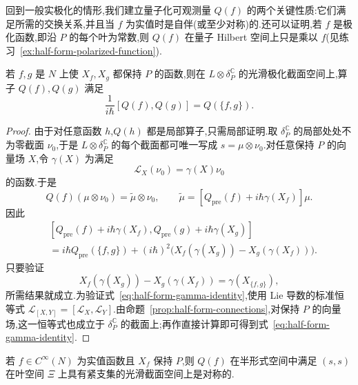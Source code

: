 回到一般实极化的情形,我们建立量子化可观测量 $Q(f)$ 的两个关键性质:它们满足所需的交换关系,并且当 $f$ 为实值时是自伴(或至少对称)的.还可以证明,若 $f$ 是极化函数,即沿 $P$ 的每个叶为常数,则 $Q(f)$ 在量子 Hilbert 空间上只是乘以 $f$(见练习~\ref{ex:half-form-polarized-function}).

\begin{theorem}[半形式量子算子的交换关系]
\label{thm:half-form-commutator-real}
若 $f,g$ 是 $N$ 上使 $X_f,X_g$ 都保持 $P$ 的函数,则在 $L\otimes\delta_P^{\mathbb C}$ 的光滑极化截面空间上,算子 $Q(f),Q(g)$ 满足
\[
 \frac1{i\hbar}[Q(f),Q(g)]=Q(\{f,g\}).
 \label{eq:half-form-commutator-real}
\]
\end{theorem}

\begin{proof}
由于对任意函数 $h$,$Q(h)$ 都是局部算子,只需局部证明.取 $\delta_P^{\mathbb C}$ 的局部处处不为零截面 $\nu_0$,于是 $L\otimes\delta_P^{\mathbb C}$ 的每个截面都可唯一写成 $s=\mu\otimes\nu_0$.对任意保持 $P$ 的向量场 $X$,令 $\gamma(X)$ 为满足
\[
 \mathcal L_X(\nu_0)=\gamma(X)\nu_0
\]
的函数.于是
\[
 Q(f)(\mu\otimes\nu_0)=\widetilde\mu\otimes\nu_0,
 \qquad \widetilde\mu=[Q_{\mathrm{pre}}(f)+i\hbar\gamma(X_f)]\mu.
\]
因此
\[
\begin{aligned}
 &[Q_{\mathrm{pre}}(f)+i\hbar\gamma(X_f),Q_{\mathrm{pre}}(g)+i\hbar\gamma(X_g)]\\
 &=i\hbar Q_{\mathrm{pre}}(\{f,g\})
 +(i\hbar)^2\bigl(X_f(\gamma(X_g))-X_g(\gamma(X_f))\bigr).
\end{aligned}
\]
只要验证
\[
 X_f(\gamma(X_g))-X_g(\gamma(X_f))=\gamma(X_{\{f,g\}}),
 \label{eq:half-form-gamma-identity}
\]
所需结果就成立.为验证式~\eqref{eq:half-form-gamma-identity},使用 Lie 导数的标准恒等式 $\mathcal L_{[X,Y]}=[\mathcal L_X,\mathcal L_Y]$.由命题~\ref{prop:half-form-connections},对保持 $P$ 的向量场,这一恒等式也成立于 $\delta_P^{\mathbb C}$ 的截面上;再作直接计算即可得到式~\eqref{eq:half-form-gamma-identity}.
\end{proof}

\begin{theorem}[实函数的半形式对称性]
\label{thm:half-form-symmetric-real}
若 $f\in C^\infty(N)$ 为实值函数且 $X_f$ 保持 $P$,则 $Q(f)$ 在半形式空间中满足 $(s,s)$ 在叶空间 $\Xi$ 上具有紧支集的光滑截面空间上是对称的.
\end{theorem}

